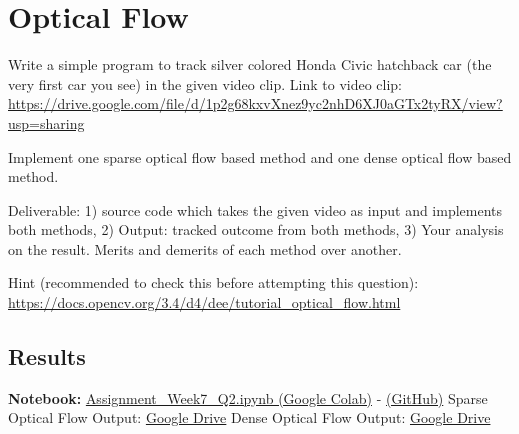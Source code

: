 \documentclass[12pt,a4paper]{article}
\begin{document}
\section{Optical Flow}
Write a simple program to track silver colored Honda Civic hatchback car (the very first car you see) in the given video clip. 
Link to video clip: \url{https://drive.google.com/file/d/1p2g68kxvXnez9yc2nhD6XJ0aGTx2tyRX/view?usp=sharing}

Implement one sparse optical flow based method and one dense optical flow based method.

Deliverable: 1) source code which takes the given video as input and implements both methods, 2) Output: tracked outcome from both methods, 
3) Your analysis on the result. Merits and demerits of each method over another.

Hint (recommended to check this before attempting this question): \url{https://docs.opencv.org/3.4/d4/dee/tutorial_optical_flow.html}


\subsection{Results}

\textbf{Notebook:} \href{https://colab.research.google.com/drive/1e2mMba6YOY2pt4cyBrOAsf8wfL6rVag4?usp=sharing}{Assignment\_Week7\_Q2.ipynb (Google Colab)} - 
\href{https://github.com/bkhanal-11/ties411_cvip_jyu/blob/master/assignment7/src/Assignment_Week7_Q2.ipynb}{(GitHub)}
\newline
Sparse Optical Flow Output: \href{https://drive.google.com/file/d/1iLkjQO8ZW9hpywKb2z5pnCL-cukpZUon/view?usp=sharing}{Google Drive}
\newline
Dense Optical Flow Output: \href{https://drive.google.com/file/d/1LyLgQWyLzUiwqHsQQL1IQbtPpALp8bBU/view?usp=sharing}{Google Drive}
\end{document}
